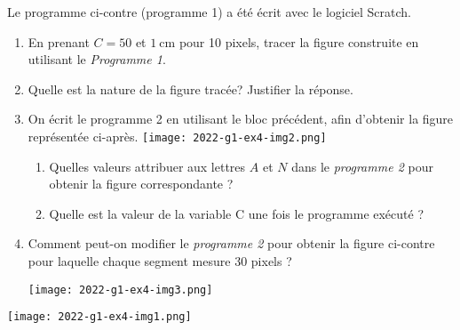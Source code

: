 
\begin{minipage}[t]{.6\linewidth}
	Le programme ci-contre (programme 1) a été écrit avec le logiciel Scratch.

\begin{enumerate}
  \item En prenant $C=50$ et $1 \mathrm{~cm}$ pour 10 pixels, tracer la figure construite en utilisant le \textit{Programme 1}.

  \item Quelle est la nature de la figure tracée? Justifier la réponse.

  \item On écrit le programme 2 en utilisant le bloc précédent, afin d'obtenir la figure représentée ci-après.
  \texttt{[image: 2022-g1-ex4-img2.png]}
  
	\begin{enumerate}
		\item Quelles valeurs attribuer aux lettres $A$ et $N$ dans le \textit{programme 2} pour obtenir la figure correspondante ?
		\item Quelle est la valeur de la variable $\mathrm{C}$ une fois le programme exécuté ?
	\end{enumerate}

\item Comment peut-on modifier le \textit{programme 2} pour obtenir la figure ci-contre pour laquelle chaque segment mesure 30 pixels ?

	\centering
	\texttt{[image: 2022-g1-ex4-img3.png]}
\end{enumerate}

\end{minipage}
\begin{minipage}[t]{.4\linewidth}
    \vspace{0cm}
	\texttt{[image: 2022-g1-ex4-img1.png]}
\end{minipage}

